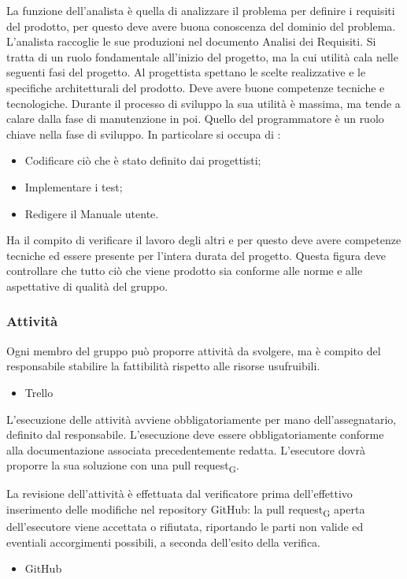 La funzione dell'analista è quella di analizzare il problema per definire i requisiti del prodotto, per questo deve avere buona conoscenza del dominio del problema. L'analista raccoglie le sue produzioni nel documento Analisi dei Requisiti. Si tratta di un ruolo fondamentale all'inizio del progetto, ma la cui utilità cala nelle seguenti fasi del progetto.
Al progettista spettano le scelte realizzative e le specifiche architetturali del prodotto. Deve avere buone competenze tecniche e tecnologiche. Durante il processo di sviluppo la sua utilità è massima, ma tende a calare dalla fase di manutenzione in poi.
Quello del programmatore è un ruolo chiave nella fase di sviluppo. In particolare si occupa di :
\begin{itemize}
    \item Codificare ciò che è stato definito dai progettisti;
    \item Implementare i test;
    \item Redigere il Manuale utente.
\end{itemize}
Ha il compito di verificare il lavoro degli altri e per questo deve avere competenze tecniche ed essere presente per l'intera durata del progetto. Questa figura deve controllare che tutto ciò che viene prodotto sia conforme alle norme e alle aspettative di qualità del gruppo.


\subsubsection{Attività}
Ogni membro del gruppo può proporre attività da svolgere, ma è compito del responsabile stabilire la fattibilità rispetto alle risorse usufruibili. 
    \begin{itemize}
        \item Trello
    \end{itemize}

L'esecuzione delle attività avviene obbligatoriamente per mano dell'assegnatario, definito dal responsabile. L'esecuzione deve essere obbligatoriamente conforme alla documentazione associata precedentemente redatta. L'esecutore dovrà proporre la sua soluzione con una pull request\textsubscript{G}.

La revisione dell'attività è effettuata dal verificatore prima dell'effettivo inserimento delle modifiche nel repository GitHub: la pull request\textsubscript{G} aperta dell'esecutore viene accettata o rifiutata, riportando le parti non valide ed eventiali accorgimenti possibili, a seconda dell'esito della verifica.
    \begin{itemize}
        \item GitHub
    \end{itemize}

